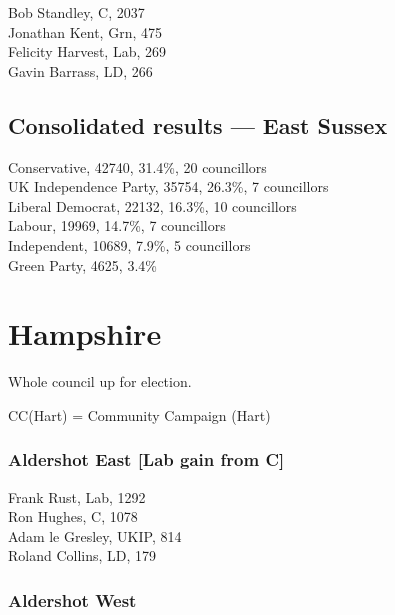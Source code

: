 \documentclass[a4paper,openany,10pt]{book}
\begin{document}


Bob Standley, C, 2037\\
Jonathan Kent, Grn, 475\\
Felicity Harvest, Lab, 269\\
Gavin Barrass, LD, 266\\




\subsection*{Consolidated results --- East Sussex}
Conservative, 42740, 31.4\%, 20 councillors\\
UK Independence Party, 35754, 26.3\%, 7 councillors\\
Liberal Democrat, 22132, 16.3\%, 10 councillors\\
Labour, 19969, 14.7\%, 7 councillors\\
Independent, 10689, 7.9\%, 5 councillors\\
Green Party, 4625, 3.4\% \\


\vfill

\section{Hampshire}

Whole council up for election.

CC(Hart) = Community Campaign (Hart)



\subsubsection*{Aldershot East \hspace*{\fill}\nolinebreak[1]%
\enspace\hspace*{\fill}
[Lab gain from C]}



Frank Rust, Lab, 1292\\
Ron Hughes, C, 1078\\
Adam le Gresley, UKIP, 814\\
Roland Collins, LD, 179\\


\subsubsection*{Aldershot West}
\end{document}
